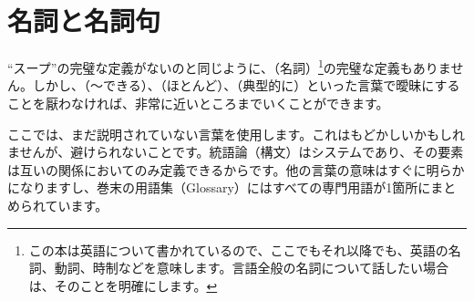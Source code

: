 \section{名詞と名詞句}\label{sec:nouns}

\enquote{スープ}の完璧な定義がないのと同じように、（名詞）\footnote{この本は英語について書かれているので、ここでもそれ以降でも、英語の名詞、動詞、時制などを意味します。言語全般の名詞について話したい場合は、そのことを明確にします。}の完璧な定義もありません。しかし、（〜できる）、（ほとんど）、（典型的に）といった言葉で曖昧にすることを厭わなければ、非常に近いところまでいくことができます。

ここでは、まだ説明されていない言葉を使用します。これはもどかしいかもしれませんが、避けられないことです。統語論（構文）はシステムであり、その要素は互いの関係においてのみ定義できるからです。他の言葉の意味はすぐに明らかになりますし、巻末の用語集（Glossary）にはすべての専門用語が1箇所にまとめられています。

